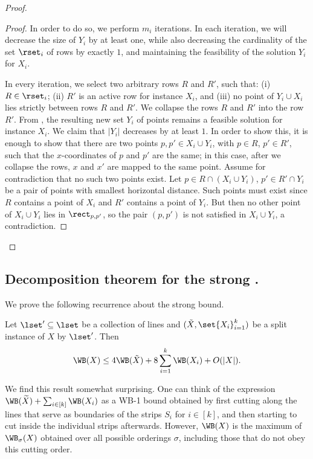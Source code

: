 \begin{proof}
\begin{proof}
                In order to do so, we perform $m_i$ iterations. In each iteration, we will decrease the size of $Y_i$ by at least one, while also decreasing the cardinality of the set $\rset_i$ of rows by exactly $1$, and maintaining the feasibility of the solution $Y_i$ for $X_i$.  
                
                In every iteration, we select two arbitrary rows $R$ and $R'$, such that: (i) $R\in \rset_i$; (ii) $R'$ is an active row for instance $X_i$, and (iii) no point of $Y_i\cup X_i$ lies strictly between rows $R$ and $R'$. 
                We collapse the rows $R$ and $R'$ into the row $R'$. 
From , the resulting new set $Y_i$ of points remains a feasible solution for instance $X_i$. 
We claim that $|Y_i|$ decreases by at least $1$. In order to show this, it is enough to show that there are two points $p,p'\in X_i\cup Y_i$, with $p\in R$, $p'\in R'$, such that the $x$-coordinates of $p$ and $p'$ are the same; in this case, after we collapse the rows, $x$ and $x'$ are mapped to the same point. Assume for contradiction that no such two points exist. Let $p\in R\cap (X_i\cup Y_i)$, $p'\in R'\cap Y_i$ be a pair of points with smallest horizontal distance. Such points must exist since $R$ contains a point of $X_i$ and $R'$ contains a point of $Y_i$. But then no other point of  $X_i\cup Y_i$ lies in $\rect_{p,p'}$, so the pair $(p,p')$ is not satisfied in $X_i\cup Y_i$, a contradiction.
%
%
%
%
%
\end{proof}
%
\end{proof}



%
%
%
%
\subsection{Decomposition theorem for the strong \WBone.}
\label{thm: wb}
%
%
We prove the following recurrence about the strong \WBone bound. 
%
%
%


\begin{theorem}\label{thm: WB for corner and strip instances}
%
%
        Let $\lset' \subseteq \lset$ be a collection of lines and $(\tilde{X}, \set{X_i}_{i=1}^k)$ be a split instance of $X$ by $\lset'$. Then 
	$$\WB(X)\leq 4\WB(\tilde{X})+8\sum_{i=1}^k\WB(X_i)+O(|X|).   $$
\end{theorem}


We find this result somewhat surprising. 
One can think of the expression $\WB(\widetilde{X})+\sum_{i \in [k]}\WB(X_i)$ as a WB-1 bound obtained by first cutting along the lines that serve as boundaries of the strips $S_i$ for $i \in [k]$, and then starting to cut inside the individual strips afterwards. However, $\WB(X)$ is the maximum of $\WB_{\sigma}(X)$ obtained over all possible orderings $\sigma$, including those that do not obey this cutting order. %
%


